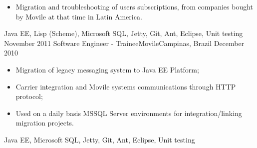 \begin{experiences}
{\begin{itemize}
             used by Movile's Mobile Billing and Messaging systems;
            \item Migration and troubleshooting of users subscriptions, from companies bought by Movile at that time in Latin America.\\
          \end{itemize}
        }{Java EE, Lisp (Scheme), Microsoft SQL, Jetty, Git, Ant, Eclipse, Unit testing}
  \emptySeparator
  \experience
  {November 2011} {Software Engineer - Trainee}{Movile}{Campinas, Brazil}
  {December 2010}
        {
          \begin{itemize}
            \item Migration of legacy messaging system to Java EE Platform;
            \item Carrier integration and Movile systems communications through HTTP protocol;
            \item Used on a daily basis MSSQL Server environments for integration/linking migration projects.\\
          \end{itemize}
        }{Java EE, Microsoft SQL, Jetty, Git, Ant, Eclipse, Unit testing}
\end{experiences}

